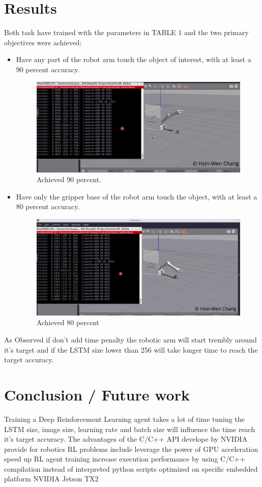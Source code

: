 \documentclass[10pt,journal,compsoc]{IEEEtran}
\begin{document}
\section{Results}
Both task have trained with the parameters in TABLE 1 and the two primary objectives were achieved:
\begin{itemize}
\item Have any part of the robot arm touch the object of interest, with at least a 90 percent accuracy. 
\begin{figure}[htpb]
      \centering
      \includegraphics[width=\linewidth]{90.png}
      \caption{Achieved 90 percent.}
      \label{fig:achieved 90 percent}
\end{figure}
\item Have only the gripper base of the robot arm touch the object, with at least a 80 percent accuracy.
\begin{figure}[htpb]
      \centering
      \includegraphics[width=\linewidth]{80.png}
      \caption{Achieved 80 percent}
      \label{fig:achieved 80 percent}
\end{figure}
\end {itemize}
As Observed if don't add time penalty the robotic arm will start trembly around it's target and if the LSTM size lower than 256 will take longer time to reach the target accuracy.

\section{Conclusion / Future work}
Training a Deep Reinforcement Learning agent takes a lot of time tuning the LSTM size, image size, learning rate and batch size will influence the time reach it's target accuracy. The advantages of the C/C++ API develope by NVIDIA provide for robotics RL problems include leverage the power of GPU acceleration speed up RL agent training increase execution performance by using C/C++ compilation instead of interpreted python scripts optimized on specific embedded platform NVIDIA Jetson TX2
\end{document}
